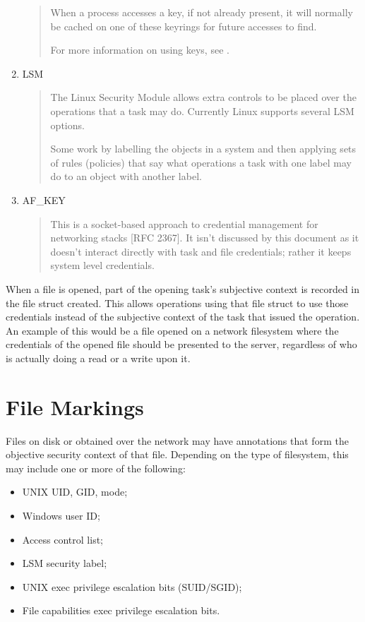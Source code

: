 \documentclass[a4paper,8pt,english]{sphinxmanual}
\begin{document}
\begin{enumerate}
\begin{quote}
When a process accesses a key, if not already present, it will normally be
cached on one of these keyrings for future accesses to find.

For more information on using keys, see .
\end{quote}

\item {} 
LSM
\begin{quote}

The Linux Security Module allows extra controls to be placed over the
operations that a task may do.  Currently Linux supports several LSM
options.

Some work by labelling the objects in a system and then applying sets of
rules (policies) that say what operations a task with one label may do to
an object with another label.
\end{quote}

\item {} 
AF\_KEY
\begin{quote}

This is a socket-based approach to credential management for networking
stacks {[}RFC 2367{]}.  It isn't discussed by this document as it doesn't
interact directly with task and file credentials; rather it keeps system
level credentials.
\end{quote}

\end{enumerate}

When a file is opened, part of the opening task's subjective context is
recorded in the file struct created.  This allows operations using that file
struct to use those credentials instead of the subjective context of the task
that issued the operation.  An example of this would be a file opened on a
network filesystem where the credentials of the opened file should be presented
to the server, regardless of who is actually doing a read or a write upon it.


\section{File Markings}
\label{security/credentials:file-markings}
Files on disk or obtained over the network may have annotations that form the
objective security context of that file.  Depending on the type of filesystem,
this may include one or more of the following:
\begin{itemize}
\item {} 
UNIX UID, GID, mode;

\item {} 
Windows user ID;

\item {} 
Access control list;

\item {} 
LSM security label;

\item {} 
UNIX exec privilege escalation bits (SUID/SGID);

\item {} 
File capabilities exec privilege escalation bits.

\end{itemize}
\end{document}
